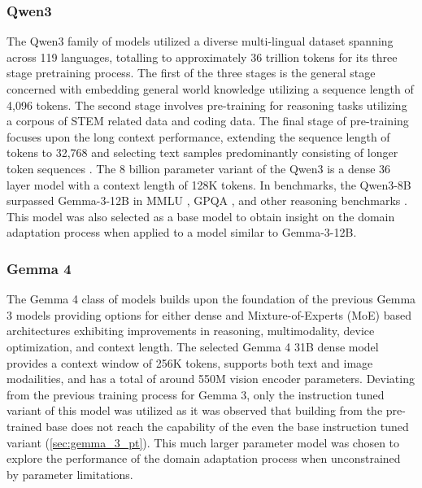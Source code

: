 \subsubsection{Qwen3}
The Qwen3 family of models utilized a diverse multi-lingual dataset spanning
across 119 languages, totalling to approximately 36 trillion tokens for its
three stage pretraining process. The first of the three stages is the general
stage concerned with embedding general world knowledge utilizing a sequence
length of 4,096 tokens. The second stage involves pre-training for reasoning
tasks utilizing a corpous of STEM related data and coding data. The final stage
of pre-training focuses upon the long context performance, extending the
sequence length of tokens to 32,768 and selecting text samples predominantly
consisting of longer token sequences \cite{yang_qwen3_2025}. The 8 billion
parameter variant of the Qwen3 is a dense 36 layer model with a context length
of 128K tokens. In benchmarks, the Qwen3-8B surpassed Gemma-3-12B in MMLU
\cite{wang_mmlu-pro_2024}, GPQA \cite{rein_gpqa_2023}, and other reasoning
benchmarks \cite{yang_qwen3_2025}. This model was also selected as a base model
to obtain insight on the domain adaptation process when applied to a model
similar to Gemma-3-12B. 

\subsubsection{Gemma 4}
The Gemma 4 class of models builds upon the foundation of the previous Gemma 3
models providing options for either dense and Mixture-of-Experts (MoE) based
architectures exhibiting improvements in reasoning, multimodality, device
optimization, and context length. The selected Gemma 4 31B dense model provides
a context window of 256K tokens, supports both text and image modailities, and
has a total of around 550M vision encoder parameters. Deviating from the
previous training process for Gemma 3, only the instruction tuned variant of
this model was utilized as it was observed that building from the pre-trained
base does not reach the capability of the even the base instruction tuned
variant (\ref{sec:gemma_3_pt}). This much larger parameter model was chosen to
explore the performance of the domain adaptation process when unconstrained by
parameter limitations.

